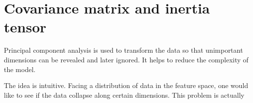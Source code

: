 \section{Covariance matrix and inertia tensor}
Principal component analysis is used to transform the data so that unimportant dimensions can be revealed and later ignored. It helps to reduce the complexity of the model.

The idea is intuitive. Facing a distribution of data in the feature space, one would like to see if the data collapse along certain dimensions. This problem is actually 
